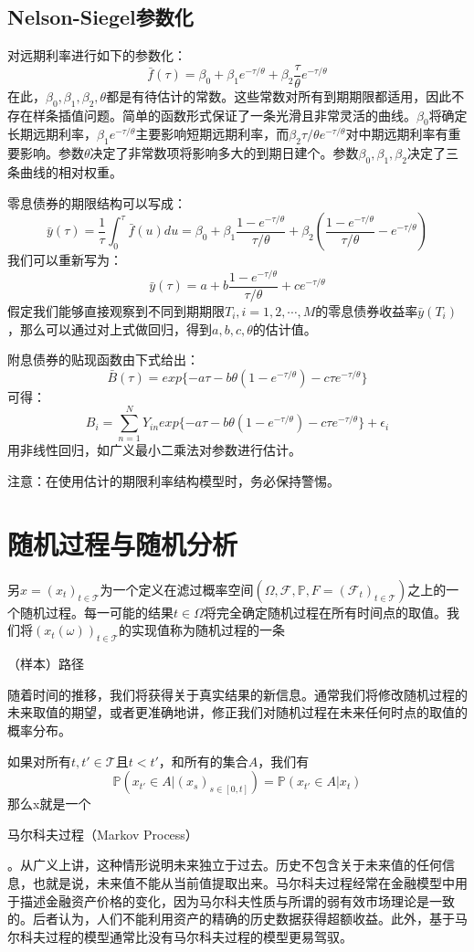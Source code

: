 \documentclass[UTF8]{ctexart}
\newcommand \qd[1] {\begin{qds} {#1} \end{qds}}
\begin{document}
\subsection{Nelson-Siegel参数化}
对远期利率进行如下的参数化：
$$\bar f(\tau)=\beta_0+\beta_1 e^{-\tau/\theta} + \beta_2 \frac{\tau}{\theta} e^{-\tau/\theta}$$
在此，$\beta_0,\beta_1,\beta_2,\theta$都是有待估计的常数。这些常数对所有到期期限都适用，因此不存在样条插值问题。简单的函数形式保证了一条光滑且非常灵活的曲线。$\beta_0$将确定长期远期利率，$\beta_1 e^{-\tau/\theta}$主要影响短期远期利率，而$\beta_2 \tau/\theta e^{-\tau/\theta}$对中期远期利率有重要影响。参数$\theta$决定了非常数项将影响多大的到期日建个。参数$\beta_0,\beta_1,\beta_2$决定了三条曲线的相对权重。

零息债券的期限结构可以写成：
$$\bar y(\tau)=\frac{1}{\tau}\int_0^\tau \bar f(u)du=\beta_0+\beta_1 \frac{1-e^{-\tau/\theta}}{\tau/\theta}+\beta_2(\frac{1-e^{-\tau/\theta}}{\tau/\theta}-e^{-\tau/\theta})$$
我们可以重新写为：
$$\bar y(\tau)=a+b\frac{1-e^{-\tau/\theta}}{\tau/\theta}+ce^{-\tau/\theta}$$
假定我们能够直接观察到不同到期期限$T_i,i=1,2,\cdots,M$的零息债券收益率$\bar y(T_i)$，那么可以通过对上式做回归，得到$a,b,c,\theta$的估计值。

附息债券的贴现函数由下式给出：
$$\bar B(\tau)=exp\{-a\tau-b\theta(1-e^{-\tau/\theta})-c\tau e^{-\tau/\theta} \}$$
可得：
$$B_i=\sum\limits_{n=1}^N Y_{in}exp\{-a\tau-b\theta(1-e^{-\tau/\theta})-c\tau e^{-\tau/\theta} \}+\epsilon_i$$
用非线性回归，如广义最小二乘法对参数进行估计。

注意：在使用估计的期限利率结构模型时，务必保持警惕。

\section{随机过程与随机分析}

另$x=(x_t)_{t \in \mathscr{T}}$为一个定义在滤过概率空间$(\Omega,\mathscr{F},\mathbb{P},F=(\mathscr{F}_t)_{t \in \mathscr{T}})$之上的一个随机过程。每一可能的结果$t \in \Omega$将完全确定随机过程在所有时间点的取值。我们将$(x_t(\omega))_{t \in \mathscr{T}}$的实现值称为随机过程的一条\qd{（样本）路径}

随着时间的推移，我们将获得关于真实结果的新信息。通常我们将修改随机过程的未来取值的期望，或者更准确地讲，修正我们对随机过程在未来任何时点的取值的概率分布。

如果对所有$t,t' \in \mathscr{T} \text{且} t<t'$，和所有的集合$A$，我们有
$$\mathbb{P}(x_{t'} \in A|(x_s)_{s \in [0,t]})=\mathbb{P}(x_{t'} \in A|x_t)$$
那么x就是一个\qd{马尔科夫过程（Markov Process）}。从广义上讲，这种情形说明未来独立于过去。历史不包含关于未来值的任何信息，也就是说，未来值不能从当前值提取出来。马尔科夫过程经常在金融模型中用于描述金融资产价格的变化，因为马尔科夫性质与所谓的弱有效市场理论是一致的。后者认为，人们不能利用资产的精确的历史数据获得超额收益。此外，基于马尔科夫过程的模型通常比没有马尔科夫过程的模型更易驾驭。
\end{document}
